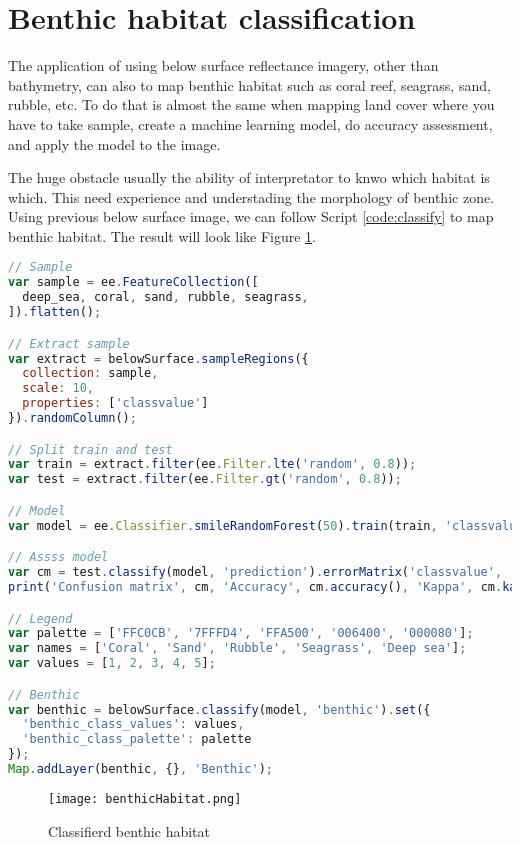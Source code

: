 \section{Benthic habitat classification}
The application of using below surface reflectance imagery, other than bathymetry, can also to map benthic habitat such as coral reef, seagrass, sand, rubble, etc. To do that is almost the same when mapping land cover where you have to take sample, create a machine learning model, do accuracy assessment, and apply the model to the image. 

The huge obstacle usually the ability of interpretator to knwo which habitat is which. This need experience and understading the morphology of benthic zone. Using previous below surface image, we can follow Script \ref{code:classify} to map benthic habitat. The result will look like Figure \ref{fig:classify}.

\begin{lstlisting}[language=JavaScript, label={code:classify}, caption={GEE script to map benthic habitat}]
// Sample
var sample = ee.FeatureCollection([
  deep_sea, coral, sand, rubble, seagrass, 
]).flatten();

// Extract sample
var extract = belowSurface.sampleRegions({
  collection: sample,
  scale: 10,
  properties: ['classvalue']
}).randomColumn();

// Split train and test
var train = extract.filter(ee.Filter.lte('random', 0.8));
var test = extract.filter(ee.Filter.gt('random', 0.8));

// Model
var model = ee.Classifier.smileRandomForest(50).train(train, 'classvalue', ['B4', 'B3', 'B2']);

// Assss model
var cm = test.classify(model, 'prediction').errorMatrix('classvalue', 'prediction');
print('Confusion matrix', cm, 'Accuracy', cm.accuracy(), 'Kappa', cm.kappa());

// Legend
var palette = ['FFC0CB', '7FFFD4', 'FFA500', '006400', '000080'];
var names = ['Coral', 'Sand', 'Rubble', 'Seagrass', 'Deep sea'];
var values = [1, 2, 3, 4, 5];

// Benthic
var benthic = belowSurface.classify(model, 'benthic').set({
  'benthic_class_values': values,
  'benthic_class_palette': palette
});
Map.addLayer(benthic, {}, 'Benthic');
\end{lstlisting}

\begin{figure}[htbp]
	\label{fig:classify}
	\centering
	\texttt{[image: benthicHabitat.png]}
	\caption{Classifierd benthic habitat}
\end{figure}

\printbibliography